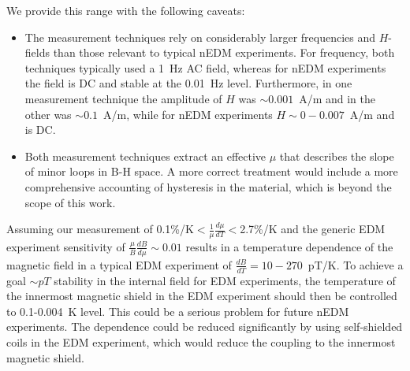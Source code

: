 \documentclass[review]{elsarticle}
\begin{document}
We provide this range with the following caveats:
\begin{itemize}
\item The measurement techniques rely on considerably larger
  frequencies and $H$-fields than those relevant to typical nEDM
  experiments.  For frequency, both techniques typically used a 1~Hz
  AC field, whereas for nEDM experiments the field is DC and stable at
  the 0.01~Hz level.  Furthermore, in one measurement technique the
  amplitude of $H$ was $\sim 0.001$~A/m and in the other was $\sim 0.1$~A/m,
  while for nEDM experiments $H\sim 0-0.007$~A/m and is DC.
\item Both measurement techniques extract an effective $\mu$ that
  describes the slope of minor loops in B-H space.  A more correct
  treatment would include a more comprehensive accounting of
  hysteresis in the material, which is beyond the scope of this work.
\end{itemize}


Assuming our measurement of
0.1\%/K$<\frac{1}{\mu}\frac{d\mu}{dT}<$2.7\%/K and the generic EDM
experiment sensitivity of $\frac{\mu}{B}\frac{dB}{d\mu}\sim 0.01$
results in a temperature dependence of the magnetic field in a typical
EDM experiment of $\frac{dB}{dT}=10-270$~pT/K.  To achieve a goal
$\sim pT$ stability in the internal field for EDM experiments, the
temperature of the innermost magnetic shield in the EDM experiment
should then be controlled to 0.1-0.004~K level.  This could be a
serious problem for future nEDM experiments.  The dependence could be
reduced significantly by using self-shielded coils in the EDM
experiment, which would reduce the coupling to the innermost magnetic
shield.








\end{document}
